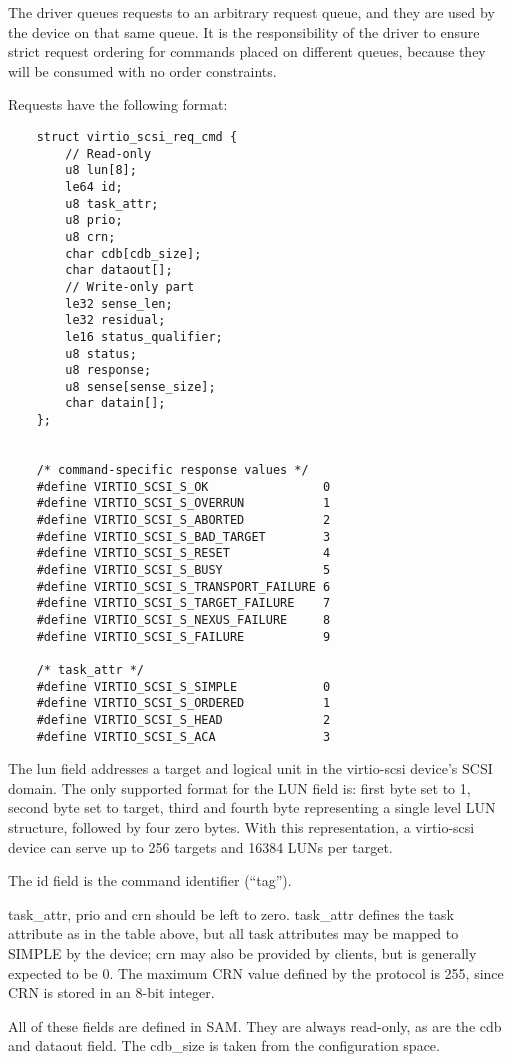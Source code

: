 The driver queues requests to an arbitrary request queue, and
they are used by the device on that same queue. It is the
responsibility of the driver to ensure strict request ordering
for commands placed on different queues, because they will be
consumed with no order constraints.

Requests have the following format:

\begin{lstlisting}
	struct virtio_scsi_req_cmd {
		// Read-only
		u8 lun[8];
		le64 id;
		u8 task_attr;
		u8 prio;
		u8 crn;
		char cdb[cdb_size];
		char dataout[];
		// Write-only part
		le32 sense_len;
		le32 residual;
		le16 status_qualifier;
		u8 status;
		u8 response;
		u8 sense[sense_size];
		char datain[];
	};


	/* command-specific response values */
	#define VIRTIO_SCSI_S_OK                0
	#define VIRTIO_SCSI_S_OVERRUN           1
	#define VIRTIO_SCSI_S_ABORTED           2
	#define VIRTIO_SCSI_S_BAD_TARGET        3
	#define VIRTIO_SCSI_S_RESET             4
	#define VIRTIO_SCSI_S_BUSY              5
	#define VIRTIO_SCSI_S_TRANSPORT_FAILURE 6
	#define VIRTIO_SCSI_S_TARGET_FAILURE    7
	#define VIRTIO_SCSI_S_NEXUS_FAILURE     8
	#define VIRTIO_SCSI_S_FAILURE           9

	/* task_attr */
	#define VIRTIO_SCSI_S_SIMPLE            0
	#define VIRTIO_SCSI_S_ORDERED           1
	#define VIRTIO_SCSI_S_HEAD              2
	#define VIRTIO_SCSI_S_ACA               3
\end{lstlisting}

The lun field addresses a target and logical unit in the
virtio-scsi device's SCSI domain. The only supported format for
the LUN field is: first byte set to 1, second byte set to target,
third and fourth byte representing a single level LUN structure,
followed by four zero bytes. With this representation, a
virtio-scsi device can serve up to 256 targets and 16384 LUNs per
target.

The id field is the command identifier (“tag”).

task_attr, prio and crn should be left to zero. task_attr defines
the task attribute as in the table above, but all task attributes
may be mapped to SIMPLE by the device; crn may also be provided
by clients, but is generally expected to be 0. The maximum CRN
value defined by the protocol is 255, since CRN is stored in an
8-bit integer.

All of these fields are defined in SAM. They are always
read-only, as are the cdb and dataout field. The cdb_size is
taken from the configuration space.

